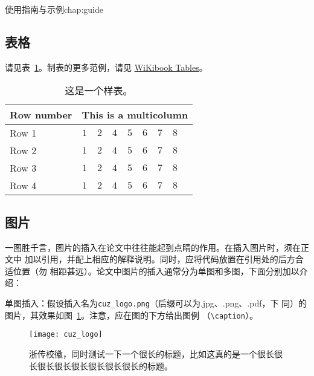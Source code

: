 \begin{cuzchapter}{使用指南与示例}{chap:guide}
    \subsection{表格}\label{sub:tables}

    请见表~\ref{tab:sample}。制表的更多范例，请见
    \href{https://en.wikibooks.org/wiki/LaTeX/Tables}{WiKibook Tables}。
    \begin{table}[!htbp]
        \caption[样表]{这是一个样表。}
        \label{tab:sample}
        \centering
        \footnotesize%
        \setlength{\tabcolsep}{4pt}%
        \renewcommand{\arraystretch}{1.2}%
        \begin{tabular}{lcccccccc}
            \hline
            Row number & \multicolumn{8}{c}{This is a multicolumn}                                     \\
            \hline
            Row 1      & $1$                                       & $2$ & $4$ & $5$ & $6$ & $7$ & $8$ \\
            Row 2      & $1$                                       & $2$ & $4$ & $5$ & $6$ & $7$ & $8$ \\
            Row 3      & $1$                                       & $2$ & $4$ & $5$ & $6$ & $7$ & $8$ \\
            Row 4      & $1$                                       & $2$ & $4$ & $5$ & $6$ & $7$ & $8$ \\
            \hline
        \end{tabular}
    \end{table}

    \subsection{图片}\label{sub:images}

    一图胜千言，图片的插入在论文中往往能起到点睛的作用。在插入图片时，须在正文中
    加以引用，并配上相应的解释说明。同时，应将代码放置在引用处的后方合适位置（勿
    相距甚远）。论文中图片的插入通常分为单图和多图，下面分别加以介绍：

    单图插入：假设插入名为\verb|cuz_logo.png|（后缀可以为.jpg、.png、.pdf，下
    同）的图片，其效果如图~\ref{fig:cuz_logo}。注意，应在图的下方给出图例
    （\verb|\caption|）。
    \begin{figure}[h]
        \centering
        \texttt{[image: cuz\_logo]}
        \caption[浙传校徽]{浙传校徽，同时测试一下一个很长的标题，比如这真的是一个很长很长很长很长很长很长很长很长的标题。}
        \label{fig:cuz_logo}
    \end{figure}


\end{cuzchapter}
